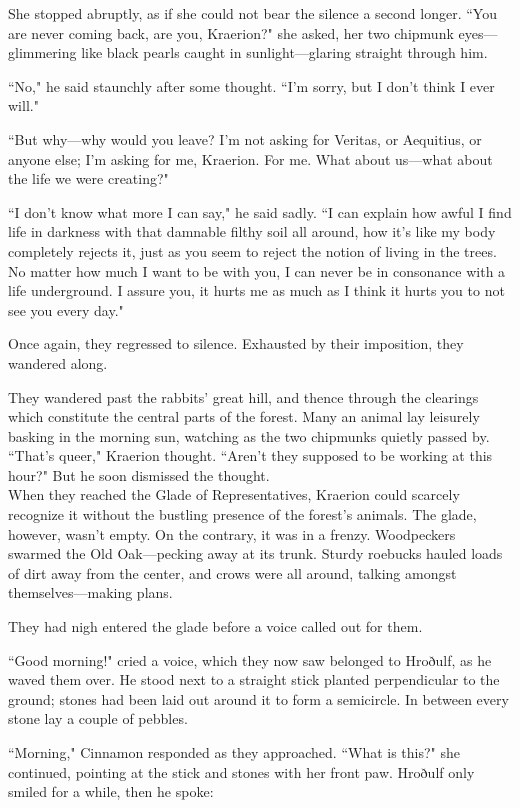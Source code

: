 She stopped abruptly, as if she could not bear the silence a second longer.
``You are never coming back, are you, Kraerion?" she asked, her two chipmunk eyes---glimmering like black pearls caught in sunlight---glaring straight through him.

``No," he said staunchly after some thought.
``I'm sorry, but I don't think I ever will."

``But why---why would you leave?
I'm not asking for Veritas, or Aequitius, or anyone else; I'm asking for me, Kraerion.
For me.
What about us---what about the life we were creating?"

``I don't know what more I can say," he said sadly. ``I can explain how awful I find life in darkness with that damnable filthy soil all around, how it's like my body completely rejects it, just as you seem to reject the notion of living in the trees.
No matter how much I want to be with you, I can never be in consonance with a life underground.
I assure you, it hurts me as much as I think it hurts you to not see you every day."

Once again, they regressed to silence.
Exhausted by their imposition, they wandered along.

They wandered past the rabbits' great hill, and thence through the clearings which constitute the central parts of the forest.
Many an animal lay leisurely basking in the morning sun, watching as the two chipmunks quietly passed by.
``That's queer," Kraerion thought.
``Aren't they supposed to be working at this hour?"
But he soon dismissed the thought.\\

When they reached the Glade of Representatives, Kraerion could scarcely recognize it without the bustling presence of the forest's animals.
The glade, however, wasn't empty.
On the contrary, it was in a frenzy.
Woodpeckers swarmed the Old Oak---pecking away at its trunk.
Sturdy roebucks hauled loads of dirt away from the center, and crows were all around, talking amongst themselves---making plans.

They had nigh entered the glade before a voice called out for them.

``Good morning!" cried a voice, which they now saw belonged to Hroðulf, as he waved them over.
He stood next to a straight stick planted perpendicular to the ground; stones had been laid out around it to form a semicircle.
In between every stone lay a couple of pebbles.

``Morning," Cinnamon responded as they approached.
``What is this?" she continued, pointing at the stick and stones with her front paw.
Hroðulf only smiled for a while, then he spoke:

